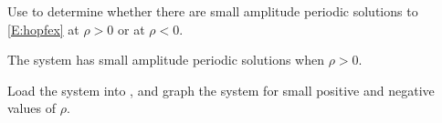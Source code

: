 \documentclass{ximera}
\begin{document}
\begin{computerExercise} \label{c9.4.4}
Use {\pplane} to determine whether there are small amplitude periodic 
solutions to \eqref{E:hopfex} at $\rho>0$ or at $\rho<0$.

\begin{solution}

\ans The system has small amplitude periodic solutions when $\rho > 0$.

\soln Load the system into \Matlab, and graph the
system for small positive and negative values of $\rho$.





\end{solution}
\end{computerExercise}
\end{document}

